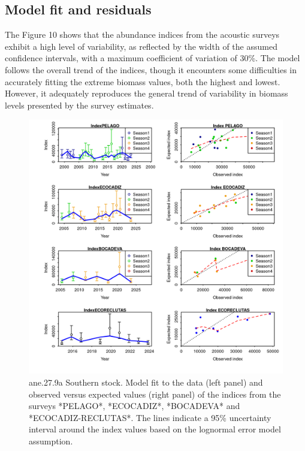 \documentclass[
]{article}
\begin{document}
\hypertarget{model-fit-and-residuals}{%
\subsection{Model fit and residuals}\label{model-fit-and-residuals}}

The Figure 10 shows that the abundance indices from the acoustic surveys
exhibit a high level of variability, as reflected by the width of the
assumed confidence intervals, with a maximum coefficient of variation of
30\%. The model follows the overall trend of the indices, though it
encounters some difficulties in accurately fitting the extreme biomass
values, both the highest and lowest. However, it adequately reproduces
the general trend of variability in biomass levels presented by the
survey estimates.

\begin{figure}[H]

{\centering \includegraphics[width=0.95\linewidth]{report/run/S1.0_4FLEETS_SelECO_RecIndex_Mnewfix/fig_indices_fit} 

}

\caption{ane.27.9a Southern stock. Model fit to the data (left panel) and observed versus expected values (right panel) of the indices from the surveys *PELAGO*, *ECOCADIZ*, *BOCADEVA* and *ECOCADIZ-RECLUTAS*. The lines indicate a 95\% uncertainty interval around the index values based on the lognormal error model assumption. }\label{fig:unnamed-chunk-14}
\end{figure}
\end{document}
